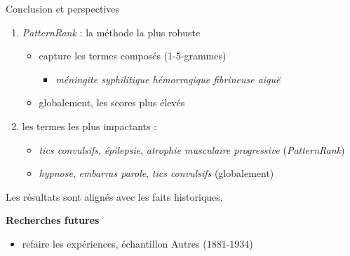 \begin{frame}{Conclusion et perspectives}
	\begin{enumerate}
		\item 	\textit{PatternRank} : la méthode la plus robuste
		\begin{itemize}
			\item capture les termes composés (1-5-grammes)
			\begin{itemize}
				\item \textit{méningite syphilitique hémorragique fibrineuse aiguë}
			\end{itemize}
			\item globalement, les scores plus élevés 
		\end{itemize}
		
		\item 	les termes les plus impactants :
		\begin{itemize}
			\item \textit{tics convulsifs}, \textit{épilepsie}, \textit{atrophie musculaire progressive} (\textit{PatternRank})
			\item \textit{hypnose}, \textit{embarras parole}, \textit{tics convulsifs} (globalement)
		\end{itemize}

	\end{enumerate}
	
	\begin{alertblock}{\vspace*{-0.6mm}}
		\centering
		Les résultats sont alignés avec les faits historiques.
	\end{alertblock}
	
	\bigskip
	{\color{RubineRed} \textbf{Recherches futures}}
	\begin{itemize}
		\item refaire les expériences, échantillon \og{}Autres\fg{} (1881-1934)
	\end{itemize}
\end{frame}

